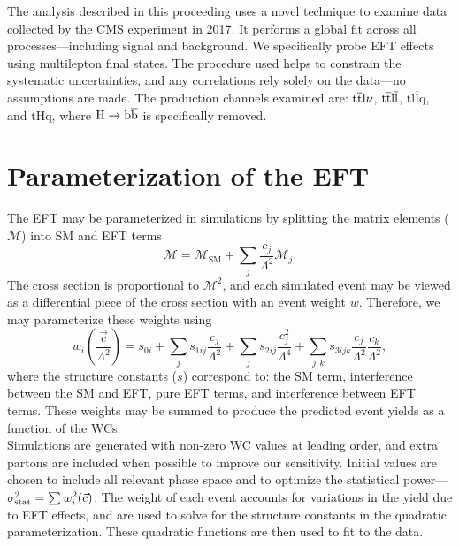 \documentclass[12pt]{article}
\begin{document}
The analysis described in this proceeding uses a novel technique to examine data collected by the CMS experiment in 2017. It performs a global fit across all processes---including signal and background. We specifically probe EFT effects using multilepton final states. The procedure used helps to constrain the systematic uncertainties, and any correlations rely solely on the data---no assumptions are made. The production channels examined are: $\mathrm{\mathrm{t\overline{t}} l\nu}$, $\mathrm{\mathrm{t\overline{t}} l\overline{l}}$, $\mathrm{t l\overline{l}q}$, and $\mathrm{tHq}$, where $\mathrm{H \to \mathrm{b\overline{b}}}$ is specifically removed.\\

\section{Parameterization of the EFT}

The EFT may be parameterized in simulations by splitting the matrix elements ($\mathcal{M}$) into SM and EFT terms
\begin{equation}
	\mathcal{M} = \mathcal{M}_{\mathrm{SM}} + \sum_{j} \frac{c_j}{\Lambda^2} \mathcal{M}_j.
\end{equation}
The cross section is proportional to $\mathcal{M}^2$, and each simulated event may be viewed as a differential piece of the cross section with an event weight $w$. Therefore, we may parameterize these weights using
\begin{equation}
	w_i\left(\frac{\vec{c}}{\Lambda^2}\right) = s_{0i} + \sum_js_{1ij}\frac{c_j}{\Lambda^2} + \sum_js_{2ij}\frac{c_j^2}{\Lambda^4} + \sum_{j,k}s_{3ijk} \frac{c_j}{\Lambda^2} \frac{c_k}{\Lambda^2},
\end{equation}
where the structure constants ($s$) correspond to: the SM term, interference between the SM and EFT, pure EFT terms, and interference between EFT terms. These weights may be summed to produce the predicted event yields as a function of the WCs.\\

Simulations are generated with non-zero WC values at leading order, and extra partons are included when possible to improve our sensitivity. Initial values are chosen to include all relevant phase space and to optimize the statistical power---$\sigma^2_{\mathrm{stat}} = \sum w^2_i(\vec{c})$. The weight of each event accounts for variations in the yield due to EFT effects, and are used to solve for the structure constants in the quadratic parameterization. These quadratic functions are then used to fit to the data.\\
\end{document}
